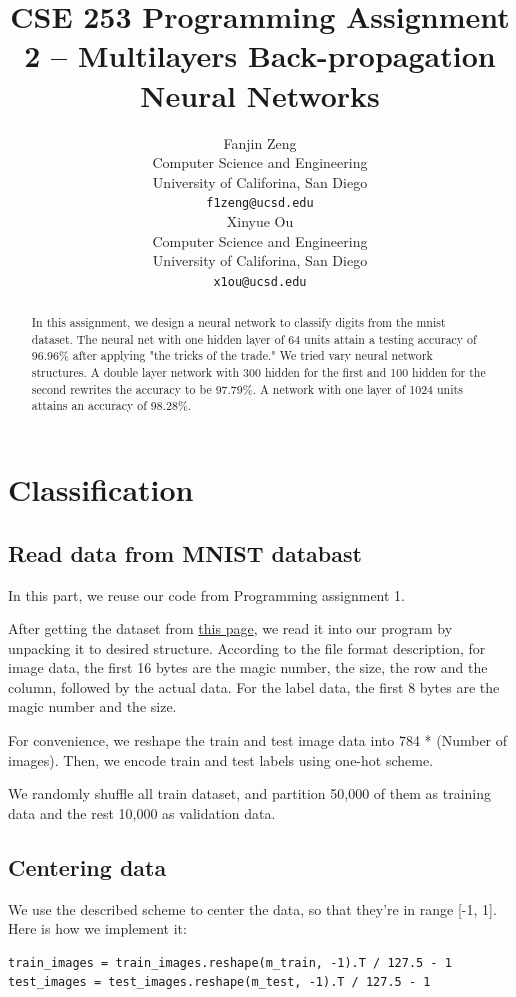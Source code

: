 \documentclass{article}
\title{CSE 253 Programming Assignment 2 -- Multilayers Back-propagation Neural Networks}
\author{
  Fanjin Zeng \\
  Computer Science and Engineering\\
  University of Califorina, San Diego\\
  \texttt{f1zeng@ucsd.edu} \\
   \And
   Xinyue Ou \\
   Computer Science and Engineering\\
   University of Califorina, San Diego \\
   \texttt{x1ou@ucsd.edu} \\
}
\begin{document}
\maketitle
\begin{abstract}
	In this assignment, we design a neural network to classify digits from the mnist dataset. The neural net with one hidden layer of 64 units attain a testing accuracy of 96.96\% after applying "the tricks of the trade." We tried vary neural network structures. A double layer network with 300 hidden for the first and 100 hidden for the second rewrites the accuracy to be 97.79\%. A network with one layer of 1024 units attains an accuracy of 98.28\%.
\end{abstract}

\section{Classification}
\subsection{Read data from MNIST databast}
In this part, we reuse our code from Programming assignment 1.

After getting the dataset from \href{http://yann.lecun.com/exdb/mnist/}{this page}, we read it into our program by unpacking it to desired structure. According to the file format description, for image data, the first 16 bytes are the magic number, the size, the row and the column, followed by the actual data. For the label data, the first 8 bytes are the magic number and the size.

For convenience, we reshape the train and test image data into 784 * (Number of images). Then, we encode train and test labels using one-hot scheme.

We randomly shuffle all train dataset, and partition 50,000 of them as training data and the rest 10,000 as validation data.

\subsection{Centering data}
We use the described scheme to center the data, so that they're in range [-1, 1]. Here is how we implement it:
\begin{lstlisting}
train_images = train_images.reshape(m_train, -1).T / 127.5 - 1
test_images = test_images.reshape(m_test, -1).T / 127.5 - 1
\end{lstlisting}
\end{document}
